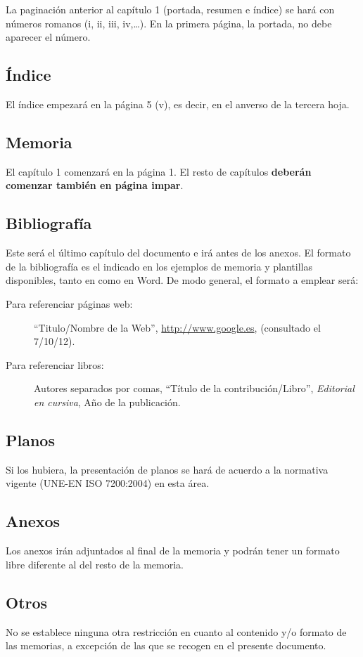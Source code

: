 La paginación anterior al capítulo 1 (portada, resumen e índice) se hará con números romanos
(i, ii, iii, iv,\dots). En la primera página, la portada, no debe aparecer el número.

\subsection{\'Indice}
El índice empezará en la página 5 (v), es decir, en el anverso de la tercera hoja.

\subsection{Memoria}
El capítulo 1 comenzará en la página 1. El resto de capítulos \textbf{deberán comenzar también en
página impar}.

\subsection{Bibliograf\'ia}

Este será el último capítulo del documento e irá antes de los anexos. El formato de la
bibliografía es el indicado en los ejemplos de memoria y plantillas disponibles, tanto en 
como en Word. De modo general, el formato a emplear será:

\begin{description}
  \item [Para referenciar páginas web:] \enquote{Titulo/Nombre de la Web},
        \url{http://www.google.es}, (consultado el 7/10/12).
  \item [Para referenciar libros:] Autores separados por comas, \enquote{Título de la contribución/Libro},
        \emph{Editorial en cursiva}, Año de la publicación.
\end{description}

\subsection{Planos}
Si los hubiera, la presentación de planos se hará de acuerdo a la normativa vigente (UNE-EN ISO
7200:2004) en esta área.

\subsection{Anexos}
Los anexos irán adjuntados al final de la memoria y podrán tener un formato libre diferente al
del resto de la memoria.

\subsection{Otros}
No se establece ninguna otra restricción en cuanto al contenido y/o formato de las memorias, a
excepción de las que se recogen en el presente documento.

